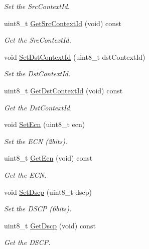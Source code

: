 \begin{DoxyCompactItemize}
\begin{DoxyCompactList}\small\item\em Set the Src\+Context\+Id. \end{DoxyCompactList}\item 
uint8\+\_\+t \hyperlink{classns3_1_1SixLowPanIphc_a36fd7bf5d538d66190e95efce63aa182}{Get\+Src\+Context\+Id} (void) const 
\begin{DoxyCompactList}\small\item\em Get the Src\+Context\+Id. \end{DoxyCompactList}\item 
void \hyperlink{classns3_1_1SixLowPanIphc_a1e8de5f976676d27486e3978a83b298e}{Set\+Dst\+Context\+Id} (uint8\+\_\+t dst\+Context\+Id)
\begin{DoxyCompactList}\small\item\em Set the Dst\+Context\+Id. \end{DoxyCompactList}\item 
uint8\+\_\+t \hyperlink{classns3_1_1SixLowPanIphc_ae2f95beaa4262a8eb117e7fde354005f}{Get\+Dst\+Context\+Id} (void) const 
\begin{DoxyCompactList}\small\item\em Get the Dst\+Context\+Id. \end{DoxyCompactList}\item 
void \hyperlink{classns3_1_1SixLowPanIphc_a4d7ef8b867b083a5f70c86847d3924d8}{Set\+Ecn} (uint8\+\_\+t ecn)
\begin{DoxyCompactList}\small\item\em Set the E\+CN (2bits). \end{DoxyCompactList}\item 
uint8\+\_\+t \hyperlink{classns3_1_1SixLowPanIphc_a0c1eeca402c0cc9df260f08326667329}{Get\+Ecn} (void) const 
\begin{DoxyCompactList}\small\item\em Get the E\+CN. \end{DoxyCompactList}\item 
void \hyperlink{classns3_1_1SixLowPanIphc_a587c9d8dad52036e1f8c174d9c60a6c0}{Set\+Dscp} (uint8\+\_\+t dscp)
\begin{DoxyCompactList}\small\item\em Set the D\+S\+CP (6bits). \end{DoxyCompactList}\item 
uint8\+\_\+t \hyperlink{classns3_1_1SixLowPanIphc_a615746366925ce0656d9f7fa87231cd6}{Get\+Dscp} (void) const 
\begin{DoxyCompactList}\small\item\em Get the D\+S\+CP. \end{DoxyCompactList}\item 

\end{DoxyCompactItemize}
